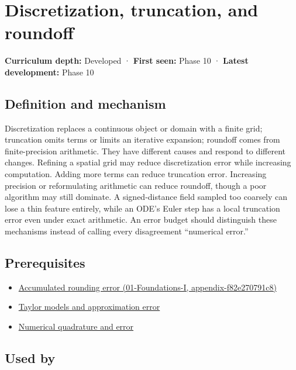 \hypertarget{appendix-6b0648b2b8e8}{}
\section{Discretization, truncation, and roundoff}\label{appendix-6b0648b2b8e8-discretization-truncation-and-roundoff}

\textbf{Curriculum depth:} Developed · \textbf{First seen:} Phase 10 · \textbf{Latest development:} Phase 10

\subsection{Definition and mechanism}\label{appendix-6b0648b2b8e8-definition-and-mechanism}

Discretization replaces a continuous object or domain with a finite grid; truncation omits terms or limits an iterative expansion; roundoff comes from finite-precision arithmetic. They have different causes and respond to different changes. Refining a spatial grid may reduce discretization error while increasing computation. Adding more terms can reduce truncation error. Increasing precision or reformulating arithmetic can reduce roundoff, though a poor algorithm may still dominate. A signed-distance field sampled too coarsely can lose a thin feature entirely, while an ODE's Euler step has a local truncation error even under exact arithmetic. An error budget should distinguish these mechanisms instead of calling every disagreement ``numerical error.''

\subsection{Prerequisites}\label{appendix-6b0648b2b8e8-prerequisites}

\begin{itemize}
\tightlist
\item
  \href{../01-Foundations-I/main.pdf\#nameddest=appendix-f82e270791c8}{Accumulated rounding error (01-Foundations-I, appendix-f82e270791c8)}
\item
  \hyperref[appendix-32f39e9a3738]{Taylor models and approximation error}
\item
  \hyperref[appendix-80521eae6b71]{Numerical quadrature and error}
\end{itemize}

\subsection{Used by}\label{appendix-6b0648b2b8e8-used-by}

